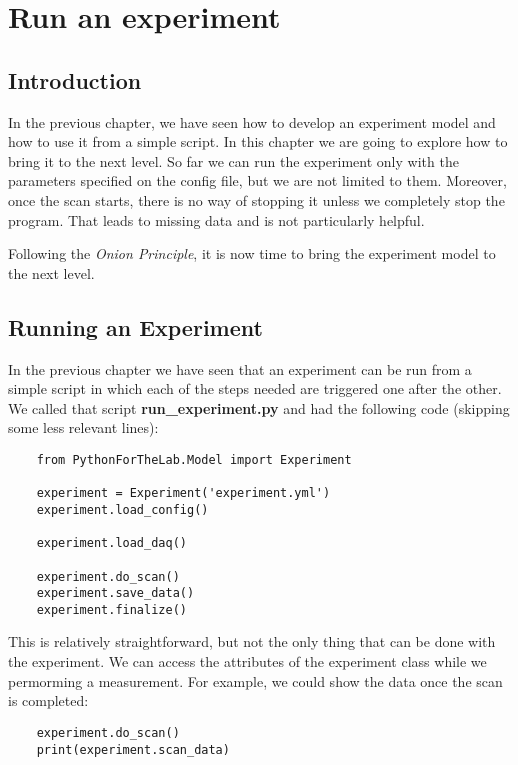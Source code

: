 \chapter{Run an experiment}\label{chapter:run-experiment}


\section{Introduction}
In the previous chapter, we have seen how to develop an experiment model and how to use it from a simple script. In this chapter we are going to explore how to bring it to the next level. So far we can run the experiment only with the parameters specified on the config file, but we are not limited to them. Moreover, once the scan starts, there is no way of stopping it unless we completely stop the program. That leads to missing data and is not particularly helpful.

Following the \emph{Onion Principle}, it is now time to bring the experiment model to the next level.


\section{Running an Experiment}\label{section:running-nexperiment}
In the previous chapter we have seen that an experiment can be run from a simple script in which each of the steps needed are triggered one after the other. We called that script \textbf{run\_experiment.py} and had the following code (skipping some less relevant lines):

\begin{verbatim}
    from PythonForTheLab.Model import Experiment

    experiment = Experiment('experiment.yml')
    experiment.load_config()

    experiment.load_daq()

    experiment.do_scan()
    experiment.save_data()
    experiment.finalize()
\end{verbatim}

This is relatively straightforward, but not the only thing that can be done with the experiment. We can access the attributes of the experiment class while we permorming a measurement. For example, we could show the data once the scan is completed:

\begin{verbatim}
    experiment.do_scan()
    print(experiment.scan_data)
\end{verbatim}


